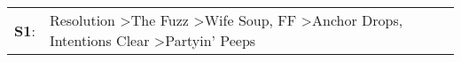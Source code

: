 \begin{supertabular}{p{0.03\textwidth}p{0.92\textwidth}}
 \textbf{S1}:  &  Resolution\textsuperscript{} \textgreater \enspace The Fuzz\textsuperscript{} \textgreater \enspace Wife Soup\textsuperscript{}, \enspace FF\textsuperscript{} \textgreater \enspace Anchor Drops\textsuperscript{}, \enspace Intentions Clear\textsuperscript{} \textgreater \enspace Partyin' Peeps\textsuperscript{}  \enspace  \\
\end{supertabular}
